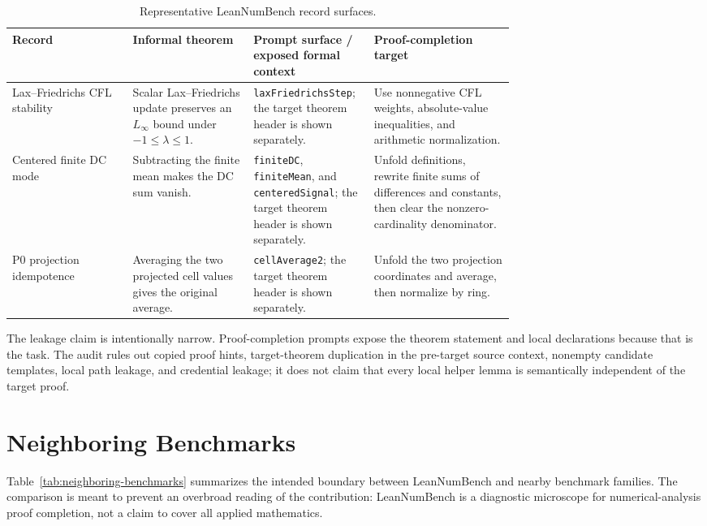 \begin{table}[H]
\centering
\caption{Representative LeanNumBench record surfaces.}
\label{tab:supp-record-examples}
\scriptsize
\begin{tabularx}{\linewidth}{
  >{\raggedright\arraybackslash}p{0.24\linewidth}
  >{\raggedright\arraybackslash}p{0.24\linewidth}
  >{\raggedright\arraybackslash}p{0.24\linewidth}
  >{\raggedright\arraybackslash}X}
\toprule
Record & Informal theorem & Prompt surface / exposed formal context & Proof-completion target\\
\midrule
Lax--Friedrichs CFL stability &
Scalar Lax--Friedrichs update preserves an \(L_\infty\) bound under
\(-1 \leq \lambda \leq 1\). &
\texttt{laxFriedrichsStep}; the target theorem header is shown separately. &
Use nonnegative CFL weights, absolute-value inequalities, and arithmetic
normalization.\\
Centered finite DC mode &
Subtracting the finite mean makes the DC sum vanish. &
\texttt{finiteDC}, \texttt{finiteMean}, and \texttt{centeredSignal}; the
target theorem header is shown separately. &
Unfold definitions, rewrite finite sums of differences and constants, then
clear the nonzero-cardinality denominator.\\
P0 projection idempotence &
Averaging the two projected cell values gives the original average. &
\texttt{cellAverage2}; the target theorem header is shown separately. &
Unfold the two projection coordinates and average, then normalize by ring.\\
\bottomrule
\end{tabularx}
\end{table}

The leakage claim is intentionally narrow. Proof-completion prompts expose the
theorem statement and local declarations because that is the task. The audit
rules out copied proof hints, target-theorem duplication in the pre-target
source context, nonempty candidate templates, local path leakage, and
credential leakage; it does not claim that every local helper lemma is
semantically independent of the target proof.

\section{Neighboring Benchmarks}

Table~\ref{tab:neighboring-benchmarks} summarizes the intended boundary between
LeanNumBench and nearby benchmark families. The comparison is meant to prevent an
overbroad reading of the contribution: LeanNumBench is a diagnostic microscope for
numerical-analysis proof completion, not a claim to cover all applied
mathematics.

